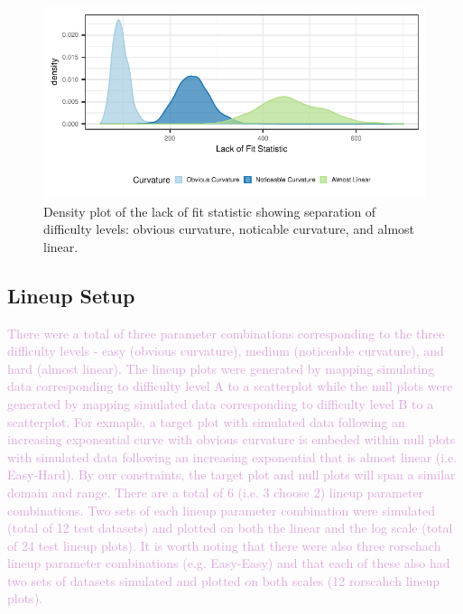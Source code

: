 \documentclass[]{interact}
\theoremstyle{plain}%
\theoremstyle{definition}
\theoremstyle{remark}
\begin{document}
\begin{figure}

{\centering \includegraphics{jsm-2021-student-paper-submission_files/figure-latex/lof-density-curves-1} 

}

\caption{Density plot of the lack of fit statistic showing separation of difficulty levels: obvious curvature, noticable curvature, and almost linear.}\label{fig:lof-density-curves}
\end{figure}

\hypertarget{lineup-setup}{%
\subsection{Lineup Setup}\label{lineup-setup}}

\textcolor{Plum}{There were a total of three parameter combinations corresponding to the three difficulty levels - easy (obvious curvature), medium (noticeable curvature), and hard (almost linear). 
The lineup plots were generated by mapping simulating data corresponding to difficulty level A to a scatterplot while the null plots were generated by mapping simulated data corresponding to difficulty level B to a scatterplot. 
For exmaple, a target plot with simulated data following an increasing exponential curve with obvious curvature is embeded within null plots with simulated data following an increasing exponential that is almost linear (i.e. Easy-Hard). 
By our constraints, the target plot and null plots will span a similar domain and range. 
There are a total of 6 (i.e. 3 choose 2) lineup parameter combinations.
Two sets of each lineup parameter combination were simulated (total of 12 test datasets) and plotted on both the linear and the log scale (total of 24 test lineup plots). 
It is worth noting that there were also three rorschach lineup parameter combinations (e.g. Easy-Easy) and that each of these also had two sets of datasets simulated and plotted on both scales (12 rorscahch lineup plots).
}
\end{document}
